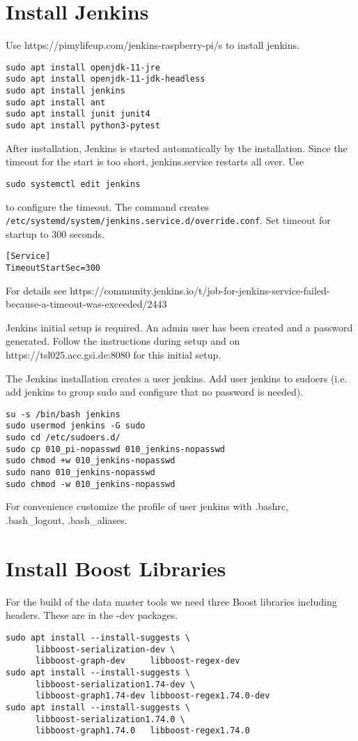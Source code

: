\documentclass[12pt,a4paper]{report}
\begin{document}
\chapter{Install Jenkins}
Use https://pimylifeup.com/jenkins-raspberry-pi/s to install jenkins.
\begin{verbatim}
sudo apt install openjdk-11-jre
sudo apt install openjdk-11-jdk-headless
sudo apt install jenkins
sudo apt install ant
sudo apt install junit junit4
sudo apt install python3-pytest
\end{verbatim}
After installation, Jenkins is started automatically by the installation.
Since the timeout for the start is too short, jenkins.service restarts all over. Use
\begin{verbatim}
sudo systemctl edit jenkins
\end{verbatim}
to configure the timeout. The command creates \\
\texttt{/etc/systemd/system/jenkins.service.d/override.conf}.
Set timeout for startup to 300 seconds.
\begin{verbatim}
[Service]
TimeoutStartSec=300
\end{verbatim}
For details see https://community.jenkins.io/t/job-for-jenkins-service-failed-because-a-timeout-was-exceeded/2443

Jenkins initial setup is required. An admin user has been created and a password generated.
Follow the instructions during setup and on \\
https://tsl025.acc.gsi.de:8080 for this initial setup.

The Jenkins installation creates a user jenkins. Add user jenkins to sudoers (i.e. add
jenkins to group sudo and configure that no password is needed).
\begin{verbatim}
su -s /bin/bash jenkins
sudo usermod jenkins -G sudo
sudo cd /etc/sudoers.d/
sudo cp 010_pi-nopasswd 010_jenkins-nopasswd
sudo chmod +w 010_jenkins-nopasswd
sudo nano 010_jenkins-nopasswd
sudo chmod -w 010_jenkins-nopasswd
\end{verbatim}

For convenience customize the profile of user jenkins with .bashrc,\\
.bash\_logout, .bash\_aliases.

\chapter{Install Boost Libraries}
For the build of the data master tools we need three Boost libraries including
headers. These are in the -dev packages.
\begin{verbatim}
sudo apt install --install-suggests \
      libboost-serialization-dev \
      libboost-graph-dev     libboost-regex-dev
sudo apt install --install-suggests \
      libboost-serialization1.74-dev \
      libboost-graph1.74-dev libboost-regex1.74.0-dev
sudo apt install --install-suggests \
      libboost-serialization1.74.0 \
      libboost-graph1.74.0   libboost-regex1.74.0
\end{verbatim}
\end{document}

